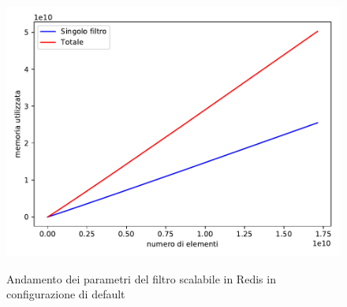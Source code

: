 \begin{figure}
\begin{minipage}[c]{0.7\textwidth}
{      \includegraphics[width=\textwidth]{img/scalingbloom_memory}%
    }
  \end{minipage}

  \caption{Andamento dei parametri del filtro scalabile in Redis in con\-fi\-gu\-ra\-zio\-ne di
  default}
  \label{fig:scalingbloom}
\end{figure}
